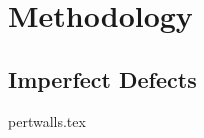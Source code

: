 \documentclass[UKenglish]{texmex/uiomasterthesis}
\begin{document}



\part{Methodology}\label{part:method}








\chapter{Imperfect Defects}\label{chap:pertwalls}
    {{pertwalls.tex}}
\end{document}

